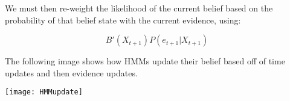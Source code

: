 We must then re-weight the likelihood of the current belief based on the probability of that belief state with the current evidence, using:

\vspace{-32px}
\begin{center}
  \begin{equation}
    B'(X_{t+1}) P(e_{t+1} | X_{t+1})
  \end{equation}
\end{center}

The following image shows how HMM\textquotesingle s update their belief based off of time updates and then evidence updates.

\begin{center}
  \texttt{[image: HMMupdate]}
\end{center}
